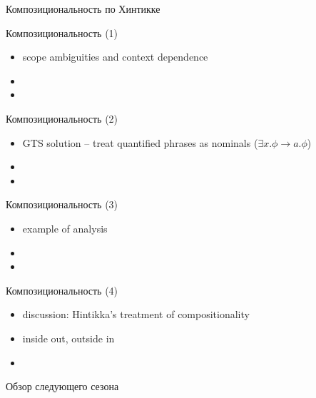 \documentclass{beamer}
\begin{document}
\begin{frame}{}
\begin{center}
Композициональность по Хинтикке
\end{center}
\end{frame}

\begin{frame}{Композициональность (1)}
\begin{itemize}
	\item scope ambiguities and context dependence
	\item 
	\item 
\end{itemize}
\end{frame}

\begin{frame}{Композициональность (2)}
\begin{itemize}
	\item GTS solution -- treat quantified phrases as nominals ($\exists x . \phi \to a . \phi$)
	\item 
	\item 
\end{itemize}
\end{frame}

\begin{frame}{Композициональность (3)}
\begin{itemize}
	\item example of analysis
	\item 
	\item 
\end{itemize}
\end{frame}

\begin{frame}{Композициональность (4)}
\begin{itemize}
	\item discussion: Hintikka's treatment of compositionality
	\item inside out, outside in
	\item 
\end{itemize}
\end{frame}



\begin{frame}{}
\begin{center}
Обзор следующего сезона
\end{center}
\end{frame}
\end{document}
